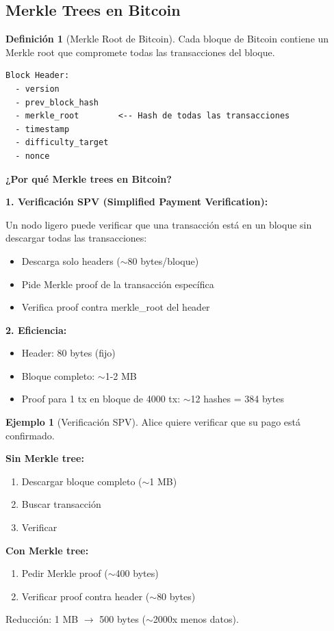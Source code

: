 \documentclass[11pt,a4paper,twoside,openright]{book}
\theoremstyle{definition}
\newtheorem{definition}{Definición}[chapter]
\newtheorem{example}{Ejemplo}[chapter]
\theoremstyle{plain}
\theoremstyle{remark}
\begin{document}
\subsection{Merkle Trees en Bitcoin}

\begin{definition}[Merkle Root de Bitcoin]
Cada bloque de Bitcoin contiene un Merkle root que compromete todas las transacciones del bloque.

\begin{verbatim}
Block Header:
  - version
  - prev_block_hash
  - merkle_root        <-- Hash de todas las transacciones
  - timestamp
  - difficulty_target
  - nonce
\end{verbatim}
\end{definition}

\begin{keyidea}
\textbf{¿Por qué Merkle trees en Bitcoin?}

\textbf{1. Verificación SPV (Simplified Payment Verification):}

Un nodo ligero puede verificar que una transacción está en un bloque sin descargar todas las transacciones:
\begin{itemize}
    \item Descarga solo headers ($\sim$80 bytes/bloque)
    \item Pide Merkle proof de la transacción específica
    \item Verifica proof contra merkle\_root del header
\end{itemize}

\textbf{2. Eficiencia:}
\begin{itemize}
    \item Header: 80 bytes (fijo)
    \item Bloque completo: $\sim$1-2 MB
    \item Proof para 1 tx en bloque de 4000 tx: $\sim$12 hashes = 384 bytes
\end{itemize}
\end{keyidea}

\begin{example}[Verificación SPV]
Alice quiere verificar que su pago está confirmado.

\textbf{Sin Merkle tree:}
\begin{enumerate}
    \item Descargar bloque completo ($\sim$1 MB)
    \item Buscar transacción
    \item Verificar
\end{enumerate}

\textbf{Con Merkle tree:}
\begin{enumerate}
    \item Pedir Merkle proof ($\sim$400 bytes)
    \item Verificar proof contra header ($\sim$80 bytes)
\end{enumerate}

Reducción: 1 MB $\to$ 500 bytes ($\sim$2000x menos datos).
\end{example}
\end{document}
